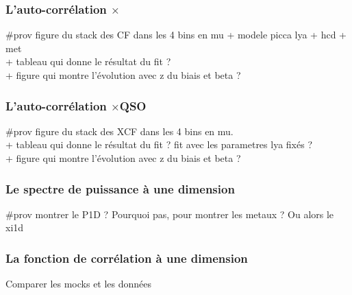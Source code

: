 \documentclass[11pt, twoside, a4paper, openright]{report}
\begin{document}
\subsubsection{L'auto-corrélation \lya{}$\times$\lya{}}
\#prov figure du stack des CF dans les 4 bins en mu + modele picca lya + hcd + met \\
+ tableau qui donne le résultat du fit ? \\
+ figure qui montre l'évolution avec z du biais et beta ?


\subsubsection{L'auto-corrélation \lya{}$\times$QSO}
\#prov figure du stack des XCF dans les 4 bins en mu. \\
+ tableau qui donne le résultat du fit ? fit avec les parametres lya fixés ?\\ 
+ figure qui montre l'évolution avec z du biais et beta ? 


\subsubsection{Le spectre de puissance à une dimension}
\#prov montrer le P1D ?
Pourquoi pas, pour montrer les metaux ? Ou alors le xi1d

\subsubsection{La fonction de corrélation à une dimension}
Comparer les mocks et les données


% 
\printbibliography
\end{document}
